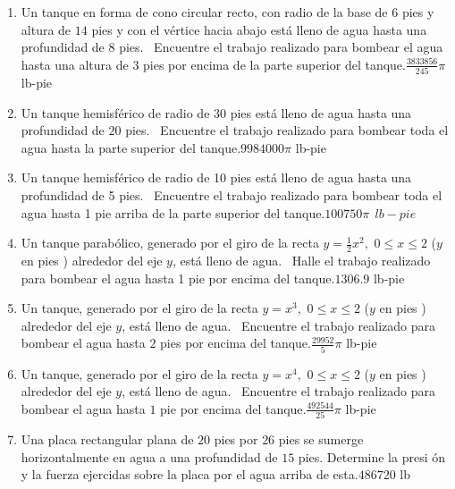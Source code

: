 {\begin{enumerate}
\item { Un tanque en forma de cono circular recto, con radio de la base de $6$ pies y altura de $14$ pies y con el vértice hacia abajo está lleno de agua
hasta una profundidad de $8$ pies. \ Encuentre el trabajo realizado para
bombear el agua hasta una altura de $3$ pies por encima de la parte superior del
tanque.}{$\frac{3833856}{245}\pi $ lb-pie}



\item {Un tanque hemisférico de radio de $30$ pies está lleno de agua
hasta una profundidad de $20$ pies. \ Encuentre el trabajo realizado para
bombear toda el agua hasta la parte superior del tanque.}{$9984000\pi $ lb-pie}



\item { Un tanque hemisférico de radio de 10 pies está lleno de agua
hasta una profundidad de 5 pies. \ Encuentre el trabajo realizado para
bombear toda el agua hasta 1 pie arriba de la parte superior del tanque.}{$100750\pi \ \ lb-pie$}



\item { Un tanque parabólico, generado por el giro de la recta $y=\frac{1}{2}%
x^{2},$ $0\leq x\leq 2$ ($y$ en pies ) alrededor del eje $y$, está lleno de
agua. \ Halle el trabajo realizado para bombear el agua hasta 1 pie por
encima del tanque.}{$1306.9 $ lb-pie}



\item { Un tanque, generado por el giro de la recta $y=x^{3},$ $0\leq x\leq 2$ ($y$ en pies ) alrededor del eje $y$, está lleno de agua. \ Encuentre el trabajo
realizado para bombear el agua hasta $2$ pies por encima del tanque.}{$\frac{29952}{5}\pi $ lb-pie}



\item {Un tanque, generado por el giro de la recta $y=x^{4},$ $0\leq x\leq 2$ ($%
y$ en pies ) alrededor del eje $y$, está lleno de agua. \ Encuentre el trabajo
realizado para bombear el agua hasta $1$ pie por encima del tanque.}{$\frac{492544}{25}\pi $ lb-pie}



\item {Una placa rectangular plana de $20$ pies por $26$ pies se sumerge
horizontalmente en agua a una profundidad de $15$ pies. Determine la presi%
ón y la fuerza ejercidas sobre la placa por el agua arriba de esta.}{$486720$ lb}




\end{enumerate}}
